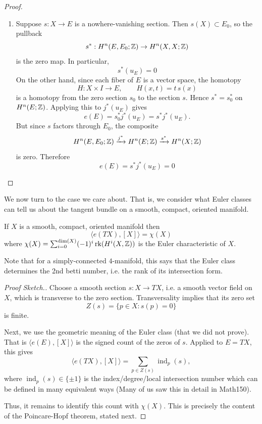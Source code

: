 \documentclass[12pt]{article}
\begin{document}
\begin{proof}
\begin{enumerate}
    \item Suppose $s:X\to E$ is a nowhere-vanishing section. Then $s(X)\subset E_0$, so the pullback
    \[ s^*:H^n(E,E_0;\mathbb Z)\to H^n(X,X;\mathbb Z) \]
    is the zero map. In particular,
    \[ s^*(u_E)=0 \]
    On the other hand, since each fiber of $E$ is a vector space, the homotopy
    \[ H:X\times I\to E,\qquad H(x,t)=t\,s(x) \]
    is a homotopy from the zero section $s_0$ to the section $s$. Hence $s^*=s_0^*$ on $H^n(E;\mathbb Z)$. Applying this to $j^*(u_E)$ gives
    \[ e(E)=s_0^*j^*(u_E)=s^*j^*(u_E). \]
    But since $s$ factors through $E_0$, the composite
    \[ H^n(E,E_0;\mathbb Z)\xrightarrow{j^*} H^n(E;\mathbb Z)\xrightarrow{s^*} H^n(X;\mathbb Z) \]
    is zero. Therefore
    \[ e(E)=s^*j^*(u_E)=0 \]
\end{enumerate}
\end{proof}

We now turn to the case we care about. That is, we consider what Euler classes can tell us about the tangent bundle on a smooth, compact, oriented manifold. 
\begin{theorem}
    If $X$ is a smooth, compact, oriented manifold then 
    \[ \langle e(TX), [X]\rangle = \chi(X)\] 
    where $\chi(X) = \sum_{i=0}^{\dim(X)}(-1)^i \operatorname{rk}(H^i(X, \mathbb Z))$ is the Euler characteristic of $X$.
\end{theorem}
Note that for a simply-connected $4$-manifold, this says that the Euler class determines the 2nd betti number, i.e. the rank of its intersection form.

\begin{proof}[Proof Sketch.]
    Choose a smooth section \(s \colon X \to TX\), i.e. a smooth vector field on \(X\), which is transverse to the zero section. Transversality implies that its zero set
    \[
        Z(s)=\{p\in X : s(p)=0\}
    \]
    is finite.
    
    Next, we use the geometric meaning of the Euler class (that we did not prove). That is $\langle e(E),[X]\rangle$ is the signed count of the zeros of \(s\). Applied to \(E=TX\), this gives
    \[
    \langle e(TX),[X]\rangle = \sum_{p\in Z(s)} \operatorname{ind}_p(s),
    \]
    where \(\operatorname{ind}_p(s)\in \{\pm 1\}\) is the index/degree/local intersection number which can be defined in many equivalent ways (Many of us saw this in detail in Math150).

    Thus, it remains to identify this count with $\chi(X)$. This is precisely the content of the Poincare-Hopf theorem, stated next.
\end{proof}
\end{document}
